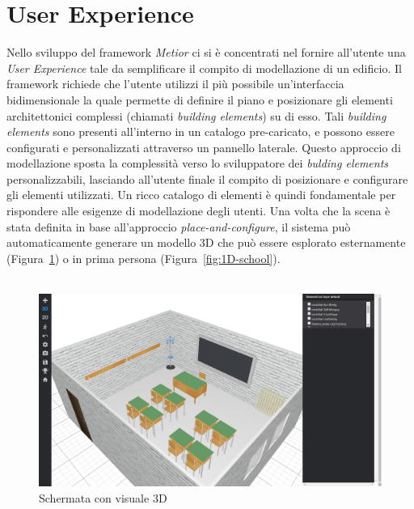 \section{User Experience}
\label{sec:chapter_2_section_1}

Nello sviluppo del framework \emph{Metior} ci si è concentrati nel fornire all'utente una \emph{User Experience} tale
da semplificare il compito di modellazione di un edificio.
Il framework richiede che l'utente utilizzi il più possibile un'interfaccia bidimensionale la quale permette
di definire il piano e posizionare gli elementi architettonici complessi (chiamati \emph{building elements}) su di esso.
Tali \emph{building elements} sono presenti all'interno in un catalogo pre-caricato, e possono essere
configurati e personalizzati attraverso un pannello laterale. Questo approccio
di modellazione sposta la complessità verso lo sviluppatore dei \emph{bulding elements} personalizzabili,
lasciando all'utente finale il compito di posizionare e configurare gli elementi utilizzati.
Un ricco catalogo di elementi \`e quindi fondamentale per rispondere alle esigenze di modellazione degli utenti.
Una volta che la scena \`e stata definita in base all'approccio \emph{place-and-configure}, il sistema può automaticamente
generare un modello 3D che pu\`o essere esplorato esternamente (Figura~\ref{fig:3D-school}) o
in prima persona (Figura~\ref{fig:1D-school}).\\\\

\begin{figure}[htbp] %
   \centering
   \includegraphics[width=1\linewidth]{images/3d-school}
   \caption{Schermata con visuale 3D}
   \label{fig:3D-school}
\end{figure}

